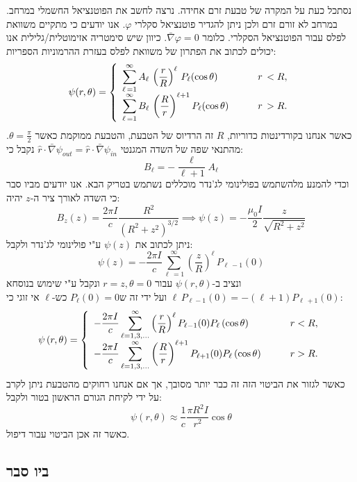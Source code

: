\documentclass{tstextbook}
\begin{document}
\begin{example}
נסתכל כעת על המקרה של טבעת זרם אחידה. נרצה לחשב את הפוטנציאל החשמלי במרחב. במרחב לא זורם זרם ולכן ניתן להגדיר פוטנציאל סקלרי \(\varphi\).
אנו יודעים כי מתקיים משוואת לפלס עבור הפוטנציאל הסקלרי. כלומר \(\bar{\nabla}\varphi=0\). כיוון שיש סימטריה אזימוטלית/גלילית אנו יכולים לכתוב את הפתרון של משוואת לפלס בעזרת ההרמוניות הספריות:
$$\psi(r,\theta)=\left\{\begin{array}{l l}{{\displaystyle\sum_{\ell\,=1}^{\infty}A_{\ell}\,\left(\frac{r}{R}\right)^{\ell}\,P_{\ell}(\cos\theta)\qquad}}&{{r\,<R,}}\\ {{\displaystyle\sum_{\ell\,=1}^{\infty}B_{\ell}\,\left(\frac{R}{r}\right)^{\ell+1}P_{\ell}(\cos\theta)\qquad}}&{{r\,>R.}}\end{array}\right.$$
כאשר אנחנו בקורדינטות כדוריות, \(R\) זה הרדיוס של הטבעת, והטבעת ממוקמת כאשר \(\theta=\frac{\pi}{2}\). מהתנאי שפה של השדה המגנטי  \(\hat{r}\cdot \bar{\nabla} \psi_{out}=\hat{r}\cdot \bar{\nabla}\psi_{in}\) נקבל כי:
$$B_{\ell}=-{\frac{\ell}{\ell+1}}A_{\ell}$$
וכדי להמנע מלהשתמש בפולינומי לג'נדר מוכללים נשתמש בטריק הבא. אנו יודעים מביו סבר כי השדה לאורך ציר ה-\(z\) יהיה:
$$B_{z}(z)=\frac{2\pi I}{c}\frac{R^{2}}{(R^{2}+z^{2})^{3/2}}\implies \psi(z)=-{\frac{\mu_{0}I}{2}}{\frac{z}{\sqrt{R^{2}+z^{2}}}}$$
ניתן לכתוב את \(\psi(z)\) ע"י פולינומי לג'נדר ולקבל:
$$\psi(z)=-\frac{2\pi I}{c}\sum_{\ell\,=1}^{\infty}\left(\frac{z}{R}\right)^{\ell}\,P_{\ell\,-1}(0)$$
ונציב ב-\(\psi\left( r,\theta \right)\) עבור \(r=z,\theta=0\) ונקבל ע"י שימוש בנוסחא \(\ell\,P_{\ell-1}(0)=-(\ell+1)P_{\ell\,+1}(0)\) ועל ידי זה ש\(P_{\ell}(0)=0\) כש-\(\ell\) אי זוגי כי:
$$\psi\left( r,\theta \right)=\left\{\begin{array}{l l}{{\displaystyle-\frac{2\pi I}{c}\sum_{\ell=1,3,...}^{\infty}\left(\frac{r}{R}\right)^{\ell}P_{\ell-1}(0)P_{\ell}\left( \cos\theta \right)\qquad}}&{{r<R,}}\\ {{\displaystyle-\frac{2\pi I}{c}\sum_{\ell=1,3,...}^{\infty}\left(\frac{R}{r}\right)^{\ell+1}P_{\ell+1}(0)P_{\ell}\left( \cos\theta \right)\qquad}}&{{r>R.}}\end{array}\right.$$
כאשר לגזור את הביטוי הזה זה כבר יותר מסובך, אך אם אנחנו רחוקים מהטבעת ניתן לקרב על ידי לקיחת הגורם הראשון בטור ולקבל:
$$\psi\left( r,\theta \right)\approx\frac{1}{c}\frac{\pi R^{2}I}{r^{2}}\cos\theta$$
כאשר זה אכן הביטוי עבור דיפול.

\end{example}
\subsection{ביו סבר}
\end{document}
